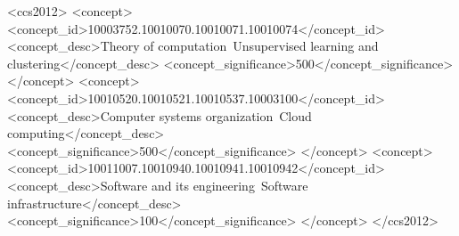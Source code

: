 \documentclass[sigconf]{acmart}
\begin{document}
\begin{abstract}
 
\end{abstract}

%
%
  \begin{CCSXML}
<ccs2012>
<concept>
<concept_id>10003752.10010070.10010071.10010074</concept_id>
<concept_desc>Theory of computation~Unsupervised learning and clustering</concept_desc>
<concept_significance>500</concept_significance>
</concept>
<concept>
<concept_id>10010520.10010521.10010537.10003100</concept_id>
<concept_desc>Computer systems organization~Cloud computing</concept_desc>
<concept_significance>500</concept_significance>
</concept>
<concept>
<concept_id>10011007.10010940.10010941.10010942</concept_id>
<concept_desc>Software and its engineering~Software infrastructure</concept_desc>
<concept_significance>100</concept_significance>
</concept>
</ccs2012>
\end{CCSXML}

\end{document}
